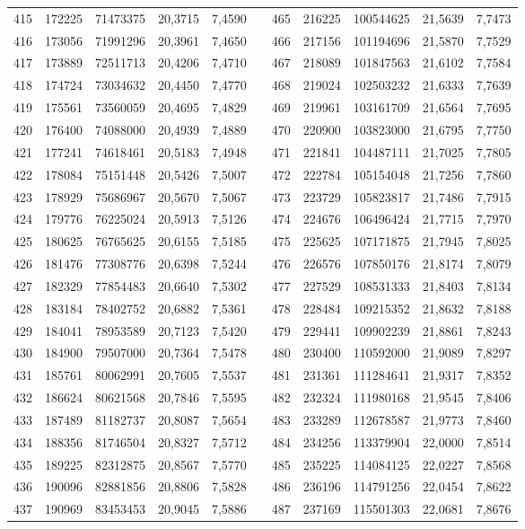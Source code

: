 \begin{longtable}{rrrrrrrrrrr}
415&172225&71473375&20,3715&7,4590&&465&216225&100544625&21,5639&7,7473\\
416&173056&71991296&20,3961&7,4650&&466&217156&101194696&21,5870&7,7529\\
417&173889&72511713&20,4206&7,4710&&467&218089&101847563&21,6102&7,7584\\
418&174724&73034632&20,4450&7,4770&&468&219024&102503232&21,6333&7,7639\\
419&175561&73560059&20,4695&7,4829&&469&219961&103161709&21,6564&7,7695\\
420&176400&74088000&20,4939&7,4889&&470&220900&103823000&21,6795&7,7750\\
421&177241&74618461&20,5183&7,4948&&471&221841&104487111&21,7025&7,7805\\
422&178084&75151448&20,5426&7,5007&&472&222784&105154048&21,7256&7,7860\\
423&178929&75686967&20,5670&7,5067&&473&223729&105823817&21,7486&7,7915\\
424&179776&76225024&20,5913&7,5126&&474&224676&106496424&21,7715&7,7970\\
425&180625&76765625&20,6155&7,5185&&475&225625&107171875&21,7945&7,8025\\
426&181476&77308776&20,6398&7,5244&&476&226576&107850176&21,8174&7,8079\\
427&182329&77854483&20,6640&7,5302&&477&227529&108531333&21,8403&7,8134\\
428&183184&78402752&20,6882&7,5361&&478&228484&109215352&21,8632&7,8188\\
429&184041&78953589&20,7123&7,5420&&479&229441&109902239&21,8861&7,8243\\
430&184900&79507000&20,7364&7,5478&&480&230400&110592000&21,9089&7,8297\\
431&185761&80062991&20,7605&7,5537&&481&231361&111284641&21,9317&7,8352\\
432&186624&80621568&20,7846&7,5595&&482&232324&111980168&21,9545&7,8406\\
433&187489&81182737&20,8087&7,5654&&483&233289&112678587&21,9773&7,8460\\
434&188356&81746504&20,8327&7,5712&&484&234256&113379904&22,0000&7,8514\\
435&189225&82312875&20,8567&7,5770&&485&235225&114084125&22,0227&7,8568\\
436&190096&82881856&20,8806&7,5828&&486&236196&114791256&22,0454&7,8622\\
437&190969&83453453&20,9045&7,5886&&487&237169&115501303&22,0681&7,8676\\

\end{longtable}
